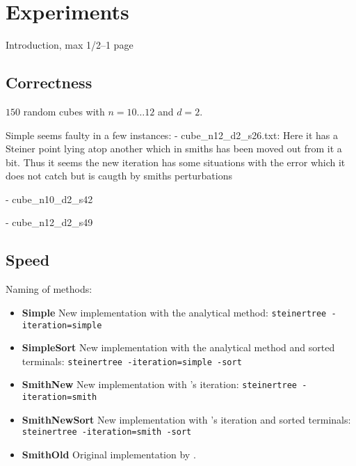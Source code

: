 {
\abnormalparskip{0pt}
\chapter{Experiments}
\label{cha:experiments}
}

Introduction, max 1/2--1 page

\section{Correctness}
\label{sec:correctness}

$150$ random cubes with $n = 10 \ldots 12$ and $d = 2$.

Simple seems faulty in a few instances:
- cube\_n12\_d2\_s26.txt: Here it has a Steiner point lying atop another which in
smiths has been moved out from it a bit. Thus it seems the new iteration has
some situations with the error which it does not catch but is caugth by smiths
perturbations

- cube\_n10\_d2\_s42

- cube\_n12\_d2\_s49

\section{Speed}
\label{sec:speed}

Naming of methods:
\begin{itemize}
\item \textbf{Simple} \quad New implementation with the analytical method:
  \texttt{steinertree~-iteration=simple}
\item \textbf{SimpleSort} \quad New implementation with the analytical method
  and sorted terminals: \texttt{steinertree~-iteration=simple~-sort}
\item \textbf{SmithNew} \quad New implementation with \citeauthor{smith1992}'s
  iteration: \texttt{steinertree~-iteration=smith}
\item \textbf{SmithNewSort} \quad New implementation with \citeauthor{smith1992}'s iteration and
  sorted terminals: \texttt{steinertree~-iteration=smith~-sort}
  \item \textbf{SmithOld} \quad Original implementation by \textcite{smith1992}.
\end{itemize}

